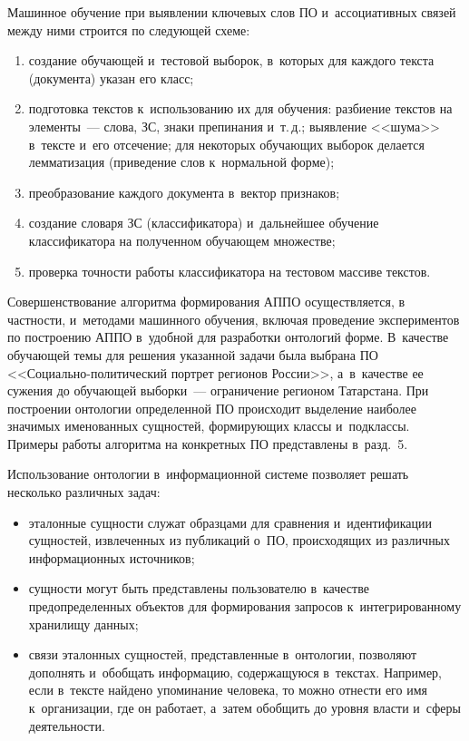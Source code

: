 \begin{multicols}{2}
     Машинное обучение при выявлении ключевых слов ПО и~ассоциативных связей между ними строится по следующей схеме:
     \begin{enumerate}[(1)]
     \item создание обучающей и~тестовой выборок, в~которых для каждого
текста (документа) указан его класс;\\[-14pt]
     \item подготовка текстов к~использованию их для обучения: разбиение
текстов на элементы~--- слова, ЗС, знаки препинания и~т.\,д.; выявление
<<шума>> в~тексте и~его отсечение; для некоторых обучающих выборок
делается лемматизация (приведение слов к~нормальной форме);\\[-13.5pt]
     \item преобразование каждого документа в~вектор признаков;\\[-13.5pt]
     \item создание словаря ЗС (классификатора) и~дальнейшее обучение
классификатора на полученном обучающем множестве;\\[-13.5pt]
     \item проверка точности работы классификатора на тестовом массиве
текстов.
     \end{enumerate}

     Совершенствование алгоритма формирования АППО осуществляется,
в частности, и~методами машинного обучения, включая проведение
экспериментов по построению \mbox{АППО} в~удобной для разработ\-ки онтологий
форме. В~качестве обучающей темы для решения указанной задачи была
выбрана ПО <<Со\-ци\-аль\-но-по\-ли\-ти\-че\-ский портрет
регионов России>>, а~в~качестве ее сужения до обуча\-ющей выборки~---
ограничение регионом Татарстана. При построении онтологии определенной
ПО происходит выделение наиболее значимых
именованных сущностей, формирующих классы и~подклассы. Примеры
работы алгоритма на конкретных ПО представлены в~разд.~5.

     Использование онтологии в~информационной системе позволяет
решать несколько различных задач:
\begin{itemize}
\item эталонные сущности служат
образцами для сравнения и~идентификации сущностей, извлеченных из
публикаций о~ПО, происходящих из различных информационных
источников;
\item сущности могут быть представлены пользователю в~качестве
предопределенных объектов для формирования запросов к~интегрированному хранилищу данных;
\item связи эталонных сущностей,
представленные в~онтологии, позволяют дополнять и~обобщать информацию,
содержащуюся в~текстах. Например, если в~тексте найдено упоминание
человека, то можно отнести его имя к~организации, где он работает, а~затем
обобщить до уровня власти и~сферы деятельности.
\end{itemize}


\end{multicols}
